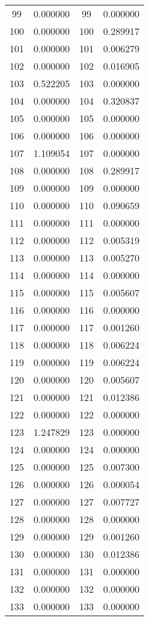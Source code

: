 \documentclass[12pt]{article}
\begin{document}
\begin{longtable}{@{}cccc@{}}
99 & 0.000000 & 99 & 0.000000 \\
100 & 0.000000 & 100 & 0.289917 \\
101 & 0.000000 & 101 & 0.006279 \\
102 & 0.000000 & 102 & 0.016905 \\
103 & 0.522205 & 103 & 0.000000 \\
104 & 0.000000 & 104 & 0.320837 \\
105 & 0.000000 & 105 & 0.000000 \\
106 & 0.000000 & 106 & 0.000000 \\
107 & 1.109054 & 107 & 0.000000 \\
108 & 0.000000 & 108 & 0.289917 \\
109 & 0.000000 & 109 & 0.000000 \\
110 & 0.000000 & 110 & 0.090659 \\
111 & 0.000000 & 111 & 0.000000 \\
112 & 0.000000 & 112 & 0.005319 \\
113 & 0.000000 & 113 & 0.005270 \\
114 & 0.000000 & 114 & 0.000000 \\
115 & 0.000000 & 115 & 0.005607 \\
116 & 0.000000 & 116 & 0.000000 \\
117 & 0.000000 & 117 & 0.001260 \\
118 & 0.000000 & 118 & 0.006224 \\
119 & 0.000000 & 119 & 0.006224 \\
120 & 0.000000 & 120 & 0.005607 \\
121 & 0.000000 & 121 & 0.012386 \\
122 & 0.000000 & 122 & 0.000000 \\
123 & 1.247829 & 123 & 0.000000 \\
124 & 0.000000 & 124 & 0.000000 \\
125 & 0.000000 & 125 & 0.007300 \\
126 & 0.000000 & 126 & 0.000054 \\
127 & 0.000000 & 127 & 0.007727 \\
128 & 0.000000 & 128 & 0.000000 \\
129 & 0.000000 & 129 & 0.001260 \\
130 & 0.000000 & 130 & 0.012386 \\
131 & 0.000000 & 131 & 0.000000 \\
132 & 0.000000 & 132 & 0.000000 \\
133 & 0.000000 & 133 & 0.000000 \\

\end{longtable}
\end{document}
